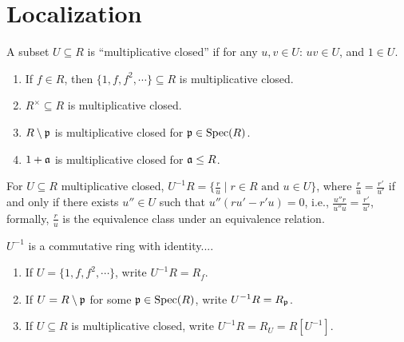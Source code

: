 \chapter{Localization}

\begin{recall}
    A subset $U \subseteq R$ is ``multiplicative closed'' if for any $u,v \in U$: $uv \in U$, and $1 \in U$. 
\end{recall}

\begin{example}
    \begin{enumerate}
        \item If $f \in R$, then $\{1,f,f^2,\cdots\} \subseteq R$ is multiplicative closed.
        \item $R^\times \subseteq R$ is multiplicative closed.
        \item $R \setminus \mathfrak{p}$ is multiplicative closed for $\mathfrak{p} \in \operatorname{Spec}(R)$.
        \item $1 + \mathfrak{a}$ is multiplicative closed for $\mathfrak{a} \leq R$.
    \end{enumerate}
\end{example}

\begin{recall}
    For $U \subseteq R$ multiplicative closed, $U^{-1}R = \{\frac{r}{u} \mid r \in R \text{ and }u \in U\}$, where $\frac{r}{u} = \frac{r'}{u'}$ if and only if there exists $u'' \in U$ such that $u''(ru'-r'u) = 0$, i.e., $\frac{u''r}{u''u} = \frac{r'}{u'}$, formally, $\frac{r}{u}$ is the equivalence class under an equivalence relation. \par 
    $U^{-1}$ is a commutative ring with identity.... 
\end{recall}

\begin{notation}
    \begin{enumerate}
        \item If $U = \{1,f,f^2,\cdots\}$, write $U^{-1}R = R_f$.
        \item If $U = R \setminus \mathfrak{p}$ for some $\mathfrak{p} \in \operatorname{Spec}(R)$, write $U^{-1}R = R_{\mathfrak{p}}$.
        \item If $U \subseteq R$ is multiplicative closed, write $U^{-1}R = R_U = R[U^{-1}]$.
    \end{enumerate}
\end{notation}

\begin{recall}
\end{recall}

